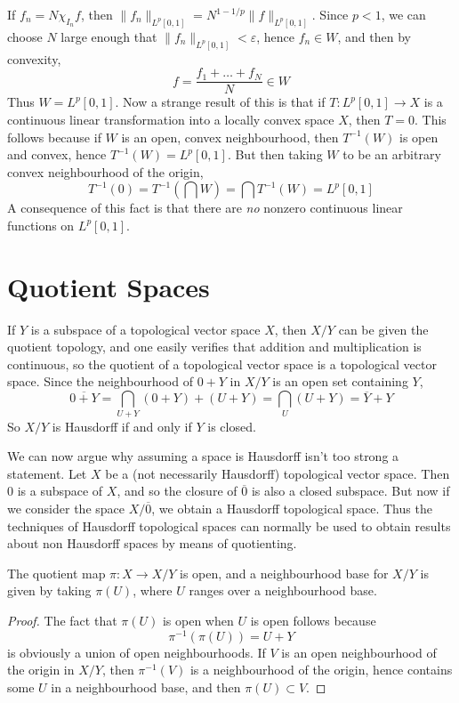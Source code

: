 \begin{example}
    If $f_n = N \chi_{I_n} f$, then $\| f_n \|_{L^p[0,1]} = N^{1-1/p} \| f \|_{L^p[0,1]}$. Since $p < 1$, we can choose $N$ large enough that $\| f_n \|_{L^p[0,1]} < \varepsilon$, hence $f_n \in W$, and then by convexity,
    \[ f = \frac{f_1 + \dots + f_N}{N} \in W \]
    Thus $W = L^p[0,1]$. Now a strange result of this is that if $T: L^p[0,1] \to X$ is a continuous linear transformation into a locally convex space $X$, then $T = 0$. This follows because if $W$ is an open, convex neighbourhood, then $T^{-1}(W)$ is open and convex, hence $T^{-1}(W) = L^p[0,1]$. But then taking $W$ to be an arbitrary convex neighbourhood of the origin,
    \[ T^{-1}(0) = T^{-1} \left( \bigcap W \right) = \bigcap T^{-1}(W) = L^p[0,1] \]
    A consequence of this fact is that there are {\it no} nonzero continuous linear functions on $L^p[0,1]$.
\end{example}

\section{Quotient Spaces}

If $Y$ is a subspace of a topological vector space $X$, then $X/Y$ can be given the quotient topology, and one easily verifies that addition and multiplication is continuous, so the quotient of a topological vector space is a topological vector space. Since the neighbourhood of $0 + Y$ in $X/Y$ is an open set containing $Y$,
%
\[ \overline{0 + Y} = \bigcap_{U + Y} (0 + Y) + (U + Y) = \bigcap_{U} (U + Y) = \overline{Y} + Y \]
%
So $X/Y$ is Hausdorff if and only if $Y$ is closed.

We can now argue why assuming a space is Hausdorff isn't too strong a statement. Let $X$ be a (not necessarily Hausdorff) topological vector space. Then $0$ is a subspace of $X$, and so the closure of $\overline{0}$ is also a closed subspace. But now if we consider the space $X/\overline{0}$, we obtain a Hausdorff topological space. Thus the techniques of Hausdorff topological spaces can normally be used to obtain results about non Hausdorff spaces by means of quotienting.

\begin{theorem}
    The quotient map $\pi: X \to X/Y$ is open, and a neighbourhood base for $X/Y$ is given by taking $\pi(U)$, where $U$ ranges over a neighbourhood base.
\end{theorem}
\begin{proof}
    The fact that $\pi(U)$ is open when $U$ is open follows because
    \[ \pi^{-1}(\pi(U)) = U + Y \]
    is obviously a union of open neighbourhoods. If $V$ is an open neighbourhood of the origin in $X/Y$, then $\pi^{-1}(V)$ is a neighbourhood of the origin, hence contains some $U$ in a neighbourhood base, and then $\pi(U) \subset V$.
\end{proof}

